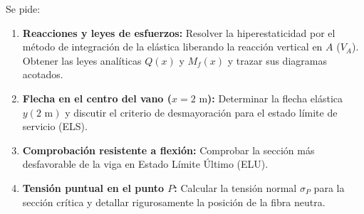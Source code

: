 Se pide:
\begin{enumerate}[label=\alph*)]
    \item \textbf{Reacciones y leyes de esfuerzos:} Resolver la hiperestaticidad por el método de integración de la elástica liberando la reacción vertical en $A$ ($V_A$). Obtener las leyes analíticas $Q(x)$ y $M_f(x)$ y trazar sus diagramas acotados.
    \item \textbf{Flecha en el centro del vano ($x = 2\text{ m}$):} Determinar la flecha elástica $y(2\text{ m})$ y discutir el criterio de desmayoración para el estado límite de servicio (ELS).
    \item \textbf{Comprobación resistente a flexión:} Comprobar la sección más desfavorable de la viga en Estado Límite Último (ELU).
    \item \textbf{Tensión puntual en el punto $P$:} Calcular la tensión normal $\sigma_P$ para la sección crítica y detallar rigurosamente la posición de la fibra neutra.
\end{enumerate}

